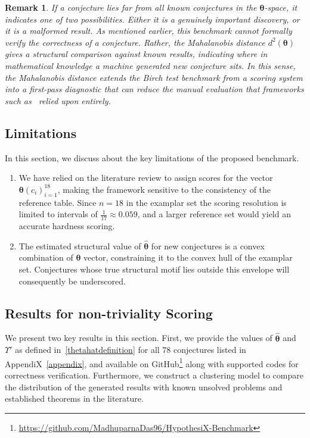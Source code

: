 \documentclass[11pt,reqno]{amsart}
\theoremstyle{plain}\newtheorem{theorem}{Theorem}[section]
\newtheorem{remark}{Remark}[section]
\numberwithin{equation}{section}
\begin{document}
\begin{remark}
If a conjecture lies far from all known conjectures in the $\bm{\theta}$-space, it indicates one of two possibilities. Either it is a genuinely important discovery, or it is a malformed result. As mentioned earlier, this benchmark cannot formally verify the correctness of a conjecture. Rather, the Mahalanobis distance $d^2(\bm{\theta})$ gives a structural comparison against known results, indicating where in mathematical knowledge a machine generated new conjecture sits. In this sense, the Mahalanobis distance extends the Birch test benchmark from a scoring system into a first-pass diagnostic that can reduce the manual evaluation that frameworks such as~\cite{alex} relied upon entirely.
\end{remark}



\subsection{Limitations}
In this section, we discuss about the key limitations of the proposed benchmark. 
\begin{enumerate}
\item We have relied on the literature review to assign scores for the vector ${\bm{\theta}(c_i)}_{i=1}^{18}$, making the framework sensitive to the consistency of the reference table. Since $n=18$ in the examplar set the scoring resolution is limited to intervals of $\frac{1}{17}\approx 0.059$, and a larger reference set would yield an accurate hardness scoring.  

\item The estimated structural value of $\bm{\hat{\theta}}$ for new conjectures is a convex combination of ${\bm{\theta}}$ vector, constraining it to the convex hull of the examplar set. Conjectures whose true structural motif lies outside this envelope will consequently be underscored. 
\end{enumerate}


\subsection{Results for non-triviality Scoring}
\noindent
We present two key results in this section. First, we provide the values of $\bm{\hat{\theta}}$ and $\Upsilon'$ as defined in~\eqref{thetahatdefinition} for all 78 conjectures listed in AppendiX~\ref{appendix}, and available on GitHub\footnote{\url{https://github.com/MadhuparnaDas96/HypothesiX-Benchmark}} along with supported codes for correctness verification. Furthermore, we construct a clustering model to compare the distribution of the generated results with known unsolved problems and established theorems in the literature.
\end{document}
